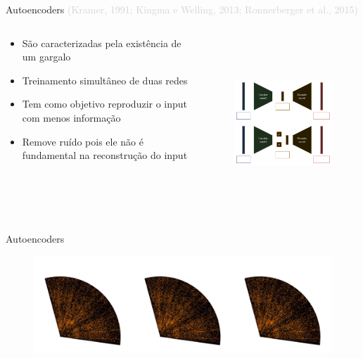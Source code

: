 \begin{frame}[c]{Autoencoders {\small \textcolor{LightGray}{(Kramer, 1991; Kingma e Welling, 2013; Ronnerberger et al., 2015)}}}
    \begin{columns}[c]
        \begin{column}{0.36\linewidth}
            \begin{splusbox}{}
                \begin{itemize}
                    \justifying
                    \item São caracterizadas pela existência de um gargalo
                    \item Treinamento simultâneo de duas redes
                    \item Tem como objetivo reproduzir o input com menos informação
                    \item Remove ruído pois ele não é fundamental na reconstrução do input
                \end{itemize}
            \end{splusbox}
        \end{column}
        \begin{column}{0.56\linewidth}
            \begin{figure}
                \centering
                \includegraphics[height=6.5cm]{script/images/autoencoders.png}
            \end{figure}
        \end{column}
    \end{columns}
\end{frame}

\begin{frame}[c]{Autoencoders}
    \begin{figure}
        \centering
        \includegraphics[width=\linewidth]{script/images/redshift_polar_plot_zml_zmlae_zmlvae.pdf}
    \end{figure}
\end{frame}

